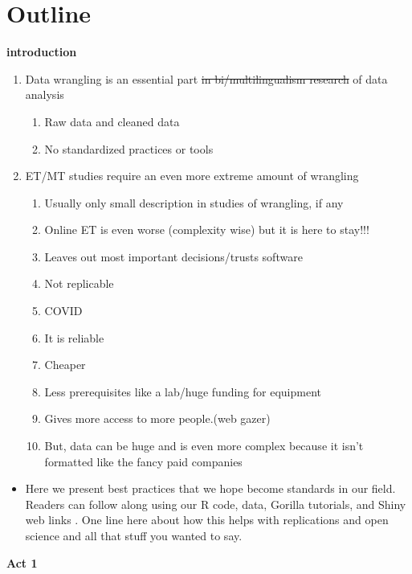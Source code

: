 \section{Outline}
\textbf{introduction}
\begin{enumerate}
   \item Data wrangling is an essential part \sout{in bi/multilingualism research} of data analysis
   \begin{enumerate}
        \item Raw data and cleaned data
        \item No standardized practices or tools
        \end{enumerate}
    \item ET/MT studies require an even more extreme amount of wrangling
       \begin{enumerate}
        \item Usually only small description in studies of wrangling, if any
        \item  Online ET is even worse (complexity wise) but it is here to stay!!!
        \item Leaves out most important decisions/trusts software
        \item Not replicable
        \item COVID
        \item It is reliable
        \item Cheaper
        \item Less prerequisites like a lab/huge funding for equipment
        \item Gives more access to more people.(web gazer)
        \item But, data can be huge and is even more complex because it isn’t formatted like the fancy paid companies
        \end{enumerate}
\end{enumerate}   

\begin {itemize}
\item Here we present best practices that we hope become standards in our field. Readers can follow along using our R code, data, Gorilla tutorials, and Shiny web links . One line here about how this helps with replications and open science and all that stuff you wanted to say.
\end{itemize}

\textbf{Act 1}


